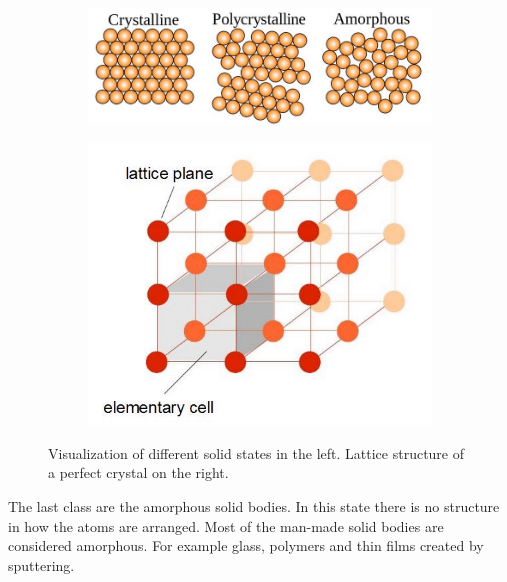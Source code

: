 \documentclass[]{article}
\begin{document}
\begin{figure}[H]
\centering
\begin{subfigure}[h]{0.59\textwidth}
\includegraphics[width=1\textwidth]{Plots/crystalline.png}
\end{subfigure}
\begin{subfigure}[h]{0.39\textwidth}
\includegraphics[width=1\textwidth]{Plots/lattice.png}
\end{subfigure}
\caption{Visualization of different solid states in the left. Lattice structure of a perfect crystal on the right. \cite{wiki}}
\end{figure}


The last class are the amorphous solid bodies. In this state there is no structure in how the atoms are arranged. Most of the man-made solid bodies are considered amorphous. For example glass, polymers and thin films created by sputtering. 
\end{document}
